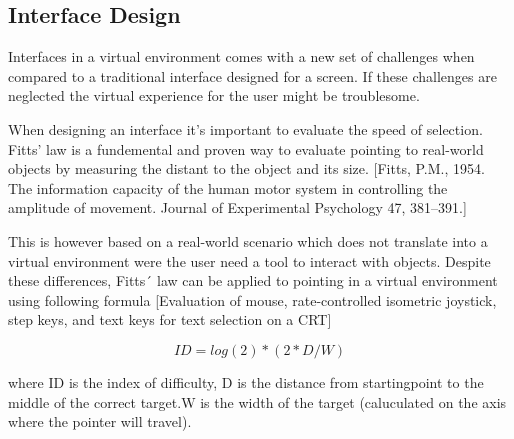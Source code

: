 \subsection{Interface Design}
Interfaces in a virtual environment comes with a new set of challenges when compared to a traditional interface designed for a screen. If these challenges are neglected the virtual experience for the user might be troublesome.

When designing an interface it's important to evaluate the speed of selection. Fitts' law is a fundemental and proven way to evaluate pointing to real-world objects by measuring the distant to the object and its size. [Fitts, P.M., 1954. The information capacity of the human motor system in controlling the amplitude of
movement. Journal of Experimental Psychology 47, 381–391.]

This is however based on a real-world scenario which does not translate into a virtual environment were the user need a tool to interact with objects. Despite these differences, Fitts´ law can be applied to pointing in a virtual environment using following formula  [Evaluation of mouse, rate-controlled isometric joystick, step keys,
and text keys for text selection on a CRT]

\begin{equation}
ID = log(2) * ( 2* D / W )
\end{equation}

where ID is the index of difficulty, D is the distance from startingpoint to the middle of the correct target.W is the width of the target (caluculated  on the axis where the pointer will travel). 
